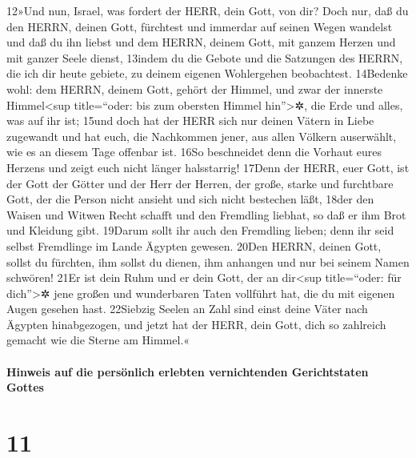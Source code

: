 12»Und nun, Israel, was fordert der HERR, dein Gott, von dir? Doch nur,
daß du den HERRN, deinen Gott, fürchtest und immerdar auf seinen Wegen
wandelst und daß du ihn liebst und dem HERRN, deinem Gott, mit ganzem
Herzen und mit ganzer Seele dienst, 13indem du die Gebote und die
Satzungen des HERRN, die ich dir heute gebiete, zu deinem eigenen
Wohlergehen beobachtest. 14Bedenke wohl: dem HERRN, deinem Gott, gehört
der Himmel, und zwar der innerste Himmel\textless sup title=``oder: bis
zum obersten Himmel hin''\textgreater✲, die Erde und alles, was auf ihr
ist; 15und doch hat der HERR sich nur deinen Vätern in Liebe zugewandt
und hat euch, die Nachkommen jener, aus allen Völkern auserwählt, wie es
an diesem Tage offenbar ist. 16So beschneidet denn die Vorhaut eures
Herzens und zeigt euch nicht länger halsstarrig! 17Denn der HERR, euer
Gott, ist der Gott der Götter und der Herr der Herren, der große, starke
und furchtbare Gott, der die Person nicht ansieht und sich nicht
bestechen läßt, 18der den Waisen und Witwen Recht schafft und den
Fremdling liebhat, so daß er ihm Brot und Kleidung gibt. 19Darum sollt
ihr auch den Fremdling lieben; denn ihr seid selbst Fremdlinge im Lande
Ägypten gewesen. 20Den HERRN, deinen Gott, sollst du fürchten, ihm
sollst du dienen, ihm anhangen und nur bei seinem Namen schwören! 21Er
ist dein Ruhm und er dein Gott, der an dir\textless sup title=``oder:
für dich''\textgreater✲ jene großen und wunderbaren Taten vollführt hat,
die du mit eigenen Augen gesehen hast. 22Siebzig Seelen an Zahl sind
einst deine Väter nach Ägypten hinabgezogen, und jetzt hat der HERR,
dein Gott, dich so zahlreich gemacht wie die Sterne am Himmel.«

\hypertarget{hinweis-auf-die-persuxf6nlich-erlebten-vernichtenden-gerichtstaten-gottes}{%
\paragraph{Hinweis auf die persönlich erlebten vernichtenden
Gerichtstaten
Gottes}\label{hinweis-auf-die-persuxf6nlich-erlebten-vernichtenden-gerichtstaten-gottes}}

\hypertarget{section-10}{%
\section{11}\label{section-10}}

